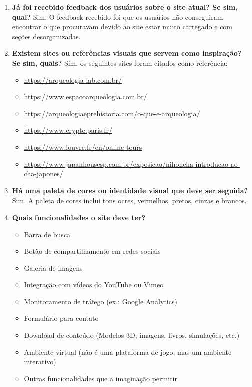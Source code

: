 \begin{enumerate}
    \item \textbf{Já foi recebido feedback dos usuários sobre o site atual? Se sim, qual?}  
    Sim. O feedback recebido foi que os usuários não conseguiram encontrar o que procuravam devido ao site estar muito carregado e com seções desorganizadas.

    \item \textbf{Existem sites ou referências visuais que servem como inspiração? Se sim, quais?}  
    Sim, os seguintes sites foram citados como referência:  
    \begin{itemize}
        \item \url{https://arqueologia-iab.com.br/}  
        \item \url{https://www.espacoarqueologia.com.br/}  
        \item \url{https://arqueologiaeprehistoria.com/o-que-e-arqueologia/}  
        \item \url{https://www.crypte.paris.fr/}  
        \item \url{https://www.louvre.fr/en/online-tours}  
        \item \url{https://www.japanhousesp.com.br/exposicao/nihoncha-introducao-ao-cha-japones/}
    \end{itemize}

    \item \textbf{Há uma paleta de cores ou identidade visual que deve ser seguida?}  
    Sim. A paleta de cores inclui tons ocres, vermelhos, pretos, cinzas e brancos.

    \item \textbf{Quais funcionalidades o site deve ter?}  
    \begin{itemize}
        \item Barra de busca  
        \item Botão de compartilhamento em redes sociais  
        \item Galeria de imagens  
        \item Integração com vídeos do YouTube ou Vimeo  
        \item Monitoramento de tráfego (ex.: Google Analytics)  
        \item Formulário para contato  
        \item Download de conteúdo (Modelos 3D, imagens, livros, simulações, etc.)  
        \item Ambiente virtual (não é uma plataforma de jogo, mas um ambiente interativo)  
        \item Outras funcionalidades que a imaginação permitir
    \end{itemize}


\end{enumerate}
